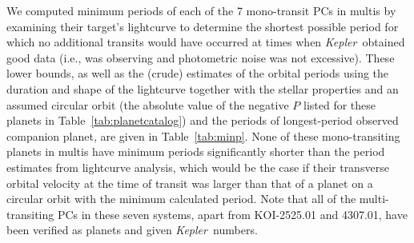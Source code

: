 \documentclass{aastex62}
\newcommand{\ik}{{\it Kepler~}}
\begin{document}
 {We computed minimum periods of each of the 7 mono-transit PCs in multis by examining their target's lightcurve to determine the shortest possible period for which no additional transits would have occurred at times when \ik obtained good data (i.e., was observing and photometric noise was not excessive). These lower bounds, as well as the (crude) estimates of the orbital periods using the duration and shape of the lightcurve together with the stellar properties and an assumed circular orbit (the absolute value of the negative  $P$ listed for these planets in Table~\ref{tab:planetcatalog}) and the periods of longest-period observed companion planet, are given in Table~\ref{tab:minp}. %
 None of these mono-transiting planets in multis have minimum periods significantly shorter than the period estimates from lightcurve analysis, which would be the case if their transverse orbital velocity at the time of transit was larger than that of a planet on a circular orbit with the minimum calculated period. Note that all of the multi-transiting PCs in these seven systems, apart from KOI-2525.01 and 4307.01, have been verified as planets and given \ik numbers.}
\end{document}
